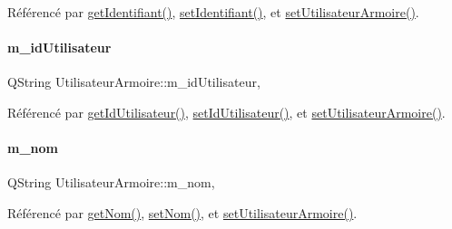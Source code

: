 Référencé par \hyperlink{class_utilisateur_armoire_a1ba08f24dedbe82671ae4e2930748f31}{get\+Identifiant()}, \hyperlink{class_utilisateur_armoire_ad1ebf69b10f99b062631a92a3f0ebd2b}{set\+Identifiant()}, et \hyperlink{class_utilisateur_armoire_a523423ac9e15b8260ca7f5ffc84c008d}{set\+Utilisateur\+Armoire()}.

\mbox{\label{class_utilisateur_armoire_a7e3072a1a336d5ee1cf87c81d27b11e0}} 
\paragraph{\texorpdfstring{m\+\_\+id\+Utilisateur}{m\_idUtilisateur}}
{\footnotesize\ttfamily Q\+String Utilisateur\+Armoire\+::m\+\_\+id\+Utilisateur\hspace{0.3cm}{\ttfamily [read]}, {\ttfamily [write]}}



Référencé par \hyperlink{class_utilisateur_armoire_a6a37ddd972e4de9db1cf3b4caa1d1755}{get\+Id\+Utilisateur()}, \hyperlink{class_utilisateur_armoire_a51fa6e41f395f6bbe1c3b763eaa93dee}{set\+Id\+Utilisateur()}, et \hyperlink{class_utilisateur_armoire_a523423ac9e15b8260ca7f5ffc84c008d}{set\+Utilisateur\+Armoire()}.

\mbox{\label{class_utilisateur_armoire_a39e1227fe3c7d726b161acab6a5c3434}} 
\paragraph{\texorpdfstring{m\+\_\+nom}{m\_nom}}
{\footnotesize\ttfamily Q\+String Utilisateur\+Armoire\+::m\+\_\+nom\hspace{0.3cm}{\ttfamily [read]}, {\ttfamily [write]}}



Référencé par \hyperlink{class_utilisateur_armoire_a0c7b68d55b8a929a2522cc693b8e250a}{get\+Nom()}, \hyperlink{class_utilisateur_armoire_a8a1031cc1ca9a197e49c0adeb1f54923}{set\+Nom()}, et \hyperlink{class_utilisateur_armoire_a523423ac9e15b8260ca7f5ffc84c008d}{set\+Utilisateur\+Armoire()}.

